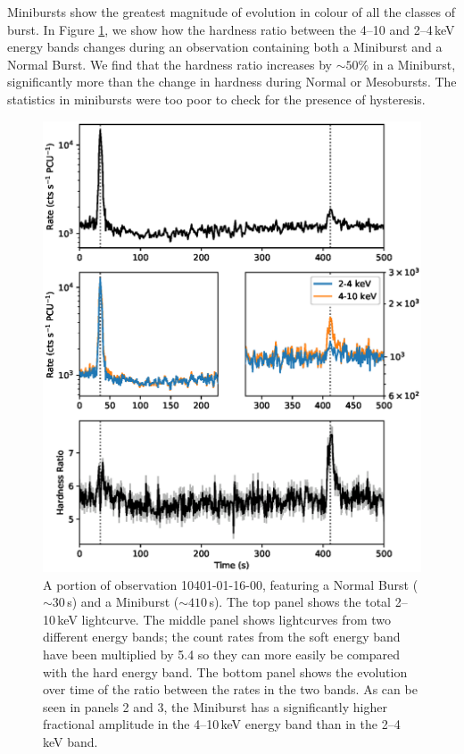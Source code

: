 \par Minibursts show the greatest magnitude of evolution in colour of all the classes of burst.  In Figure \ref{fig:minihard}, we show how the hardness ratio between the 4--10 and 2--4\,keV energy bands changes during an observation containing both a Miniburst and a Normal Burst.  We find that the hardness ratio increases by $\sim50\%$ in a Miniburst, significantly more than the change in hardness during Normal or Mesobursts.  The statistics in minibursts were too poor to check for the presence of hysteresis.

\begin{figure}
  \centering
  \includegraphics[width=.9\linewidth, trim={0.7cm 1.4cm 0.2cm 1.4cm},clip]{images/hardness_mini.eps}
  \caption[A portion of observation 10401-01-16-00, featuring a Normal Burst and a Miniburst.]{\small A portion of observation 10401-01-16-00, featuring a Normal Burst ($\sim30$\,s) and a Miniburst ($\sim410$\,s).  The top panel shows the total 2--10\,keV lightcurve.  The middle panel shows lightcurves from two different energy bands; the count rates from the soft energy band have been multiplied by 5.4 so they can more easily be compared with the hard energy band.  The bottom panel shows the evolution over time of the ratio between the rates in the two bands.   As can be seen in panels 2 and 3, the Miniburst has a significantly higher fractional amplitude in the 4--10\,keV energy band than in the 2--4\,keV band.}
  \label{fig:minihard}
\end{figure}

